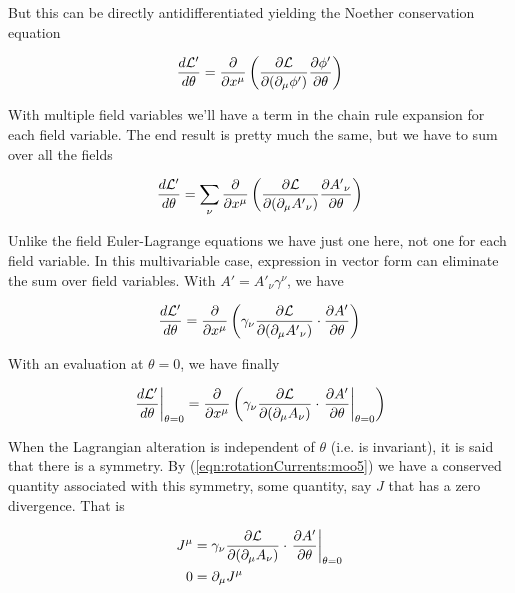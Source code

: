 But this can be directly antidifferentiated yielding the Noether conservation equation

\begin{align}\label{eqn:rotationCurrents:moo2}
\frac{d \mathcal{L}'}{d \theta}
=
\frac{\partial {}}{\partial {x^\mu}} \left( \frac{\partial {\mathcal{L}}}{\partial {(\partial_\mu \phi')}} \frac{\partial {\phi'}}{\partial {\theta}} \right)
\end{align}

With multiple field variables we'll have a term in the chain rule expansion for each field variable.  The end result is pretty much the same, but we have to sum over all the fields

\begin{align}\label{eqn:rotationCurrents:moo3}
\frac{d \mathcal{L}'}{d \theta}
=
\sum_\nu \frac{\partial {}}{\partial {x^\mu}} \left( \frac{\partial {\mathcal{L}}}{\partial {(\partial_\mu {A'}_\nu)}} \frac{\partial {{A'}_\nu}}{\partial {\theta}} \right)
\end{align}

Unlike the field Euler-Lagrange equations we have just one here, not one for each field variable.  In this multivariable case, expression in vector form can eliminate the sum over field variables.  With $A' = {A'}_\nu \gamma^\nu$, we have

\begin{align}\label{eqn:rotationCurrents:moo4}
\frac{d \mathcal{L}'}{d \theta}
=
\frac{\partial {}}{\partial {x^\mu}} \left( \gamma_\nu \frac{\partial {\mathcal{L}}}{\partial {(\partial_\mu {A'}_\nu)}} \cdot \frac{\partial {A'}}{\partial {\theta}} \right)
\end{align}

With an evaluation at $\theta = 0$, we have finally

\begin{align}\label{eqn:rotationCurrents:moo5}
{\left. \frac{d \mathcal{L}'}{d \theta} \right\vert}_{\theta=0}
=
\frac{\partial {}}{\partial {x^\mu}} \left( \gamma_\nu \frac{\partial {\mathcal{L}}}{\partial {(\partial_\mu {A}_\nu)}} \cdot {\left. \frac{\partial {A'}}{\partial {\theta}} \right\vert}_{\theta=0}\right)
\end{align}

When the Lagrangian alteration is independent of $\theta$ (i.e. is invariant), it is said that there is a symmetry.  By (\ref{eqn:rotationCurrents:moo5}) we have a conserved quantity associated with this symmetry, some quantity, say $J$ that has a zero divergence.   That is

\begin{align}\label{eqn:rotationCurrents:moo6}
J^\mu &= \gamma_\nu \frac{\partial {\mathcal{L}}}{\partial {(\partial_\mu {A}_\nu)}} \cdot {\left. \frac{\partial {A'}}{\partial {\theta}} \right\vert}_{\theta=0} \\
0 &= \partial_\mu J^\mu
\end{align}

